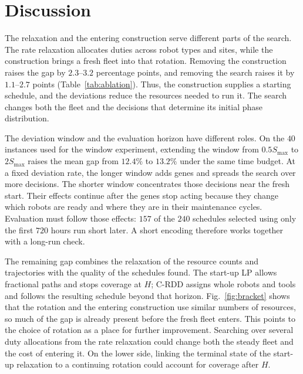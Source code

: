 \section{Discussion}
\label{sec:discussion}

The relaxation and the entering construction serve different parts of the search.
The rate relaxation allocates duties across robot types and sites, while the construction brings a fresh fleet into that rotation.
Removing the construction raises the gap by $2.3$--$3.2$ percentage points, and removing the search raises it by $1.1$--$2.7$ points (Table~\ref{tab:ablation}).
Thus, the construction supplies a starting schedule, and the deviations reduce the resources needed to run it.
The search changes both the fleet and the decisions that determine its initial phase distribution.

The deviation window and the evaluation horizon have different roles.
On the $40$ instances used for the window experiment, extending the window from $0.5S_{\max}$ to $2S_{\max}$ raises the mean gap from $12.4\%$ to $13.2\%$ under the same time budget.
At a fixed deviation rate, the longer window adds genes and spreads the search over more decisions.
The shorter window concentrates those decisions near the fresh start.
Their effects continue after the genes stop acting because they change which robots are ready and where they are in their maintenance cycles.
Evaluation must follow those effects: $157$ of the $240$ schedules selected using only the first $720$ hours run short later.
A short encoding therefore works together with a long-run check.

The remaining gap combines the relaxation of the resource counts and trajectories with the quality of the schedules found.
The start-up LP allows fractional paths and stops coverage at $H$; C-RDD assigns whole robots and tools and follows the resulting schedule beyond that horizon.
Fig.~\ref{fig:bracket} shows that the rotation and the entering construction use similar numbers of resources, so much of the gap is already present before the fresh fleet enters.
This points to the choice of rotation as a place for further improvement.
Searching over several duty allocations from the rate relaxation could change both the steady fleet and the cost of entering it.
On the lower side, linking the terminal state of the start-up relaxation to a continuing rotation could account for coverage after $H$.
